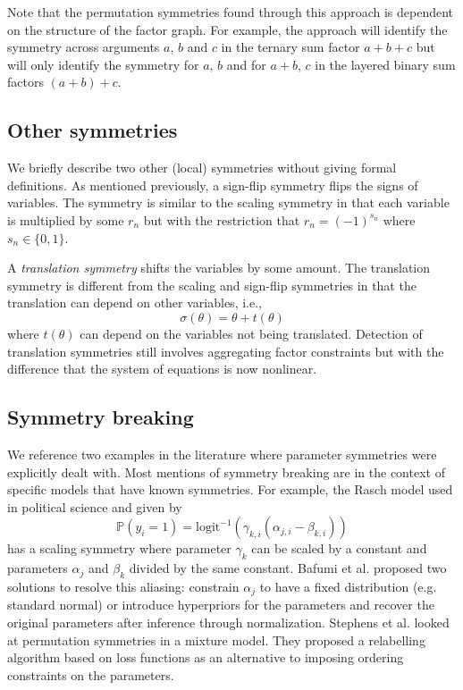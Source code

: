 Note that the permutation symmetries found through this approach is dependent on the structure of the factor graph. For example, the approach will identify the symmetry across arguments $a$, $b$ and $c$ in the ternary sum factor $a+b+c$ but will only identify the symmetry for $a$, $b$ and for $a+b$, $c$ in the layered binary sum factors $(a+b)+c$.


\subsection{Other symmetries}

We briefly describe two other (local) symmetries without giving formal definitions. As mentioned previously, a sign-flip symmetry flips the signs of variables. The symmetry is similar to the scaling symmetry in that each variable is multiplied by some $r_n$ but with the restriction that $r_n=(-1)^{s_n}$ where $s_n\in\{0,1\}$.


A \textit{translation symmetry} shifts the variables by some amount. The translation symmetry is different from the scaling and sign-flip symmetries in that the translation can depend on other variables, i.e.,
\[
\sigma(\theta)=\theta+t(\theta)
\]
where $t(\theta)$ can depend on the variables not being translated. Detection of translation symmetries still involves aggregating factor constraints but with the difference that the system of equations is now nonlinear.


\subsection{Symmetry breaking}

We reference two examples in the literature where parameter symmetries were explicitly dealt with. Most mentions of symmetry breaking are in the context of specific models that have known symmetries. For example, the Rasch model used in political science and given by
\[
\mathbb{P}(y_i=1) = \text{logit}^{-1}\left(\gamma_{k,i}(\alpha_{j,i}-\beta_{k,i})\right)
\]
has a scaling symmetry where parameter $\gamma_k$ can be scaled by a constant and parameters $\alpha_j$ and $\beta_k$ divided by the same constant. Bafumi et al. \cite{Bafumi:2005} proposed two solutions to resolve this aliasing: constrain $\alpha_j$ to have a fixed distribution (e.g. standard normal) or introduce hyperpriors for the parameters and recover the original parameters after inference through normalization. Stephens et al. \cite{Stephens:2000} looked at permutation symmetries in a mixture model. They proposed a relabelling algorithm based on loss functions as an alternative to imposing ordering constraints on the parameters.

